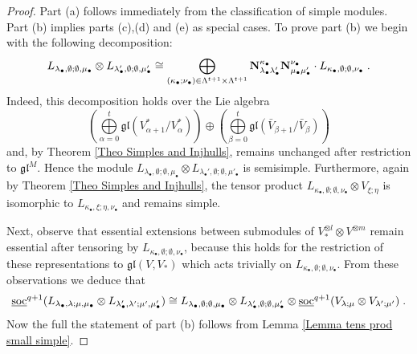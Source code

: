 \documentclass[12pt]{article}
\def\mk {\mathfrak}
\def\ul  {\underline}
\begin{document}
\begin{proof}
Part (a) follows immediately from the classification of simple modules. Part (b) implies parts (c),(d) and (e) as special cases. To prove part (b) we begin with the following decomposition:
$$
L_{\lambda_\bullet,\emptyset;\emptyset,\mu_{\bullet}}\otimes L_{\lambda_\bullet',\emptyset;\emptyset,\mu'_{\bullet}} \cong \bigoplus\limits_{(\kappa_\bullet;\nu_\bullet)\in\Lambda^{t+1}\times\Lambda^{t+1}} {\bf N}^{\kappa_\bullet}_{\lambda_\bullet\lambda_\bullet'}{\bf N}^{\nu_\bullet}_{\mu_{\bullet}\mu'_{\bullet}} \cdot L_{\kappa_\bullet,\emptyset;\emptyset,\nu_\bullet} \;.
$$
Indeed, this decomposition holds over the Lie algebra
$$
(\bigoplus\limits_{\alpha=0}^t \mk{gl}(V^*_{\alpha+1}/V^*_\alpha))\oplus(\bigoplus\limits_{\beta=0}^t \mk{gl}(\bar V_{\beta+1}/\bar V_\beta))
$$
and, by Theorem \ref{Theo Simples and Injhulls}, remains unchanged after restriction to $\mk{gl}^M$. Hence the module $L_{\lambda_\bullet,\emptyset;\emptyset,\mu_{\bullet}}\otimes L_{\lambda_\bullet',\emptyset;\emptyset,\mu'_{\bullet}}$ is semisimple. Furthermore, again by Theorem \ref{Theo Simples and Injhulls}, the tensor product $L_{\kappa_\bullet,\emptyset;\emptyset,\nu_\bullet}\otimes V_{\xi;\eta}$ is isomorphic to $L_{\kappa_\bullet,\xi;\eta,\nu_\bullet}$ and remains simple.

Next, observe that essential extensions between submodules of $V_*^{\otimes l}\otimes V^{\otimes m}$ remain essential after tensoring by $L_{\kappa_\bullet,\emptyset;\emptyset,\nu_\bullet}$, because this holds for the restriction of these representations to $\mk{gl}(V,V_*)$ which acts trivially on $L_{\kappa_\bullet,\emptyset;\emptyset,\nu_\bullet}$. From these observations we deduce that
$$
\ul{\rm soc}^{q+1}(L_{\lambda_\bullet,\lambda;\mu,\mu_\bullet}\otimes L_{\lambda_\bullet',\lambda';\mu',\mu'_\bullet}) \cong L_{\lambda_\bullet,\emptyset;\emptyset,\mu_\bullet}\otimes L_{\lambda_\bullet',\emptyset;\emptyset,\mu'_\bullet} \otimes \ul{\rm soc}^{q+1}(V_{\lambda;\mu}\otimes V_{\lambda';\mu'})\;.
$$
Now the full the statement of part (b) follows from Lemma \ref{Lemma tens prod small simple}.
\end{proof}
\end{document}
